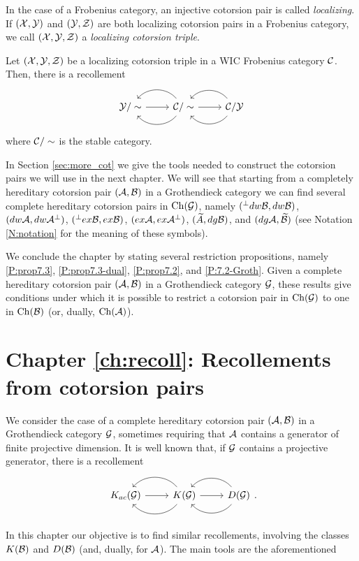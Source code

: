 In the case of a Frobenius category, an injective cotorsion pair is called \emph{localizing}. If $(\mathcal{X},\mathcal{Y})$ and $(\mathcal{Y},\mathcal{Z})$ are both localizing cotorsion pairs in a Frobenius category, we call $(\mathcal{X},\mathcal{Y},\mathcal{Z})$ a \emph{localizing cotorsion triple}.

\begin{nonlisting_cor}[\ref{cor:gill_local_recoll}]
  Let $(\mathcal{X},\mathcal{Y},\mathcal{Z})$ be a localizing cotorsion triple in a WIC Frobenius category $\mathcal{C}$. Then, there is a recollement
  \begin{equation*}
    \recdiagram{\Y/\sim}{\C/\sim}{\C/\Y}
  \end{equation*}
  where $\mathcal{C}/\sim$ is the stable category.
\end{nonlisting_cor}

In Section \ref{sec:more_cot} we give the tools needed to construct the cotorsion pairs we will use in the next chapter. We will see that starting from a completely hereditary cotorsion pair $(\mathcal{A},\mathcal{B})$ in a Grothendieck category we can find several complete hereditary cotorsion pairs in $\mathrm{Ch}(\mathcal{G})$, namely $({^\perp dw\mathcal{B}},dw \mathcal{B})$, $(dw \mathcal{A},{dw \mathcal{A}^\perp})$, $({^\perp ex\mathcal{B}},ex \mathcal{B})$, $(ex\mathcal{A}, {ex\mathcal{A}^\perp})$, $(\widetilde{A},dg \mathcal{B})$, and $(dg \mathcal{A},\widetilde{\mathcal{B}})$ (see Notation \ref{N:notation} for the meaning of these symbols).

We conclude the chapter by stating several restriction propositions, namely \ref{P:prop7.3}, \ref{P:prop7.3-dual}, \ref{P:prop7.2}, and \ref{P:7.2-Groth}. Given a complete hereditary cotorsion pair $(\mathcal{A},\mathcal{B})$ in a Grothendieck category $\mathcal{G}$, these results give conditions under which it is possible to restrict a cotorsion pair in $\mathrm{Ch}(\mathcal{G})$ to one in $\mathrm{Ch}(\mathcal{B})$ (or, dually, $\mathrm{Ch}(\mathcal{A})$).

\section*{Chapter \ref{ch:recoll}: Recollements from cotorsion pairs}

We consider the case of a complete hereditary cotorsion pair $(\mathcal{A},\mathcal{B})$ in a Grothendieck category $\mathcal{G}$, sometimes requiring that $\mathcal{A}$ contains a generator of finite projective dimension. It is well known that, if $\mathcal{G}$ contains a projective generator, there is a recollement
\begin{equation*}
  \recdiagram{K_{ac}(\G)}{K(\G)}{D(\G)}.
\end{equation*}

In this chapter our objective is to find similar recollements, involving the classes $K(\mathcal{B})$ and $D(\mathcal{B})$ (and, dually, for $\mathcal{A}$). The main tools are the aforementioned \cite[Theorem~3.4 and Corollary~4.5]{G7}

